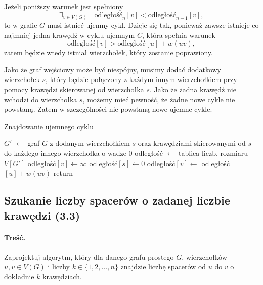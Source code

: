 Jeżeli poniższy warunek jest spełniony
\[\exists_{v\in V(G)}\quad \text{odległość}_n[v] < \text{odległość}_{n-1}[v],\]
to w grafie $G$ musi istnieć ujemny cykl. Dzieje się 
tak, ponieważ zawsze istnieje co najmniej jedna krawędź 
w cyklu ujemnym $C$, która spełnia warunek 
\[\text{odległość}[v] > \text{odległość}[u] + w(uv),\]
zatem będzie wtedy istniał wierzchołek, który zostanie 
poprawiony.

Jako że graf wejściowy może być niespójny,
musimy dodać dodatkowy wierzchołek $s$, który
będzie połączony z każdym innym wierzchołkiem
przy pomocy krawędzi skierowanej od wierzchołka $s$. Jako
że żadna krawędź nie wchodzi do wierzchołka $s$, możemy mieć pewność,
że żadne nowe cykle nie powstaną. Zatem
w szczególności nie powstaną nowe
ujemne cykle.

\begin{algorithm}[H]
	\caption{Znajdowanie ujemnego cyklu}
	\begin{algorithmic}[1]
		\State $G'$ $\gets$ graf $G$ z dodanym wierzchołkiem $s$
		oraz krawędziami skierowanymi od $s$ do każdego innego
		wierzchołka o wadze $0$
		\State odległość $\gets$ tablica liczb, rozmiaru $V[G']$
		\State odległość$[v]\gets\infty$
		\EndFor
		\State odległość$[s]\gets0$
		\State odległość$[v]\gets$ odległość$[u] + w(uv)$ 
		\EndIf
		\EndFor
		\EndFor
		\State return \true
		\EndIf
		\EndFor
		\State \Return \false
		\EndProcedure
	\end{algorithmic}
	\label{Zadanie32}
\end{algorithm}

\subsection{Szukanie liczby spacerów o zadanej liczbie krawędzi (3.3)}
\paragraph{Treść.}
Zaprojektuj algorytm, który dla danego grafu prostego 
$G$, wierzchołków $u, v \in V(G)$ i liczby $k \in
\{1, 2, \ldots , n\}$ znajdzie liczbę spacerów 
od $u$ do $v$ o dokładnie $k$ krawędziach.


